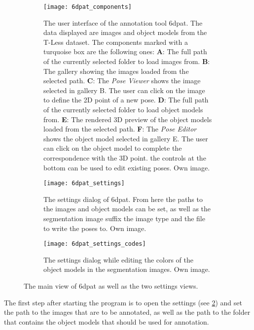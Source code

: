 \begin{figure}[!tbp]
	\centering
	\begin{subfigure}[t]{\textwidth}
		\centering
    	\texttt{[image: 6dpat\_components]}
    	\caption{The user interface of the annotation tool \gls{6dpat}. The data displayed are images and object models from the T-Less dataset. The components marked with a turquoise box are the following ones: \textbf{A}: The full path of the currently selected folder to load images from. \textbf{B}: The gallery showing the images loaded from the selected path. \textbf{C}: The \textit{Pose Viewer} shows the image selected in gallery B. The user can click on the image to define the 2D point of a new pose. \textbf{D}: The full path of the currently selected folder to load object models from. \textbf{E}: The rendered 3D preview of the object models loaded from the selected path. \textbf{F}: The \textit{Pose Editor} shows the object model selected in gallery E. The user can click on the object model to complete the correspondence with the 3D point. the controls at the bottom can be used to edit existing poses. Own image.}
    	\label{fig:6dpat_components}
	\end{subfigure}
	\par\bigskip
	\begin{subfigure}[t]{0.47\textwidth}
		\centering
    	\texttt{[image: 6dpat\_settings]}
    	\caption{The settings dialog of \gls{6dpat}. From here the paths to the images and object models can be set, as well as the segmentation image suffix the image type and the file to write the poses to. Own image.}
    	\label{fig:6dpat_settings}
	\end{subfigure}
	\hfill
	\begin{subfigure}[t]{0.47\textwidth}
	\centering
    	\texttt{[image: 6dpat\_settings\_codes]}
    	\caption{The settings dialog while editing the colors of the object models in the segmentation images. Own image.}
    	\label{fig:6dpat_settings_codes}
	\end{subfigure}
	\caption{The main view of \gls{6dpat} as well as the two settings views.}
	\label{fig:6dpat_ui_overview}
\end{figure}

The first step after starting the program is to open the settings (see \fig \ref{fig:6dpat_settings}) and set the path to the images that are to be annotated, as well as the path to the folder that contains the object models that should be used for annotation. 

